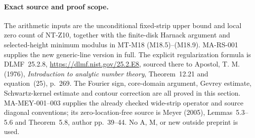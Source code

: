 \paragraph{Exact source and proof scope.}
The arithmetic inputs are the unconditional fixed-strip
upper bound and local zero count of NT-Z10, together with
the finite-disk Harnack argument and selected-height
minimum modulus in MT-M18 (M18.5)--(M18.9).
MA-RS-001 supplies the new generic-line version in full.
The explicit regularization formula is DLMF~25.2.8,
\url{https://dlmf.nist.gov/25.2.E8}, sourced there to
Apostol, T. M. (1976), \emph{Introduction to analytic
number theory}, Theorem~12.21 and equation~(25), p.~269.
The Fourier sign, core-domain argument, Gevrey estimate,
Schwartz-kernel estimate and contour correction are all
proved in this section.  MA-MEY-001--003 supplies the
already checked wide-strip operator and source
diagonal conventions; its zero-location-free source is
Meyer (2005), Lemmas~5.3--5.6 and Theorem~5.8, author
pp.~39--44.  No A, M, or new outside preprint is used.
